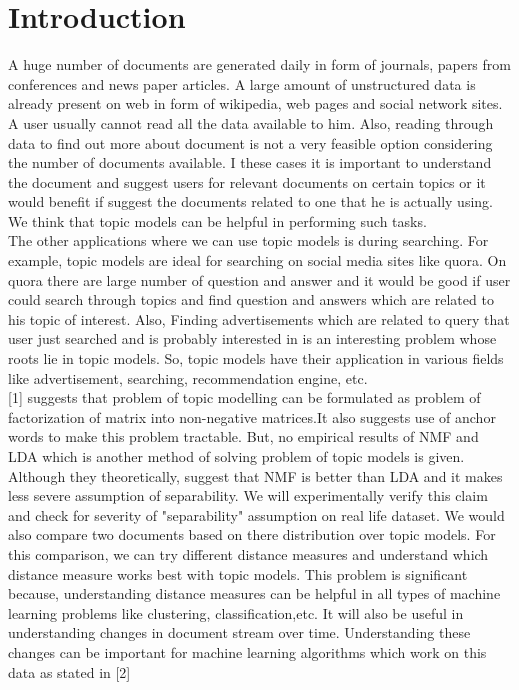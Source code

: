\documentclass[a4paper,11pt]{article}
\begin{document}
\pagebreak

\section{Introduction}
A huge number of documents are generated daily in form of journals, papers from conferences and  news paper articles. A large amount of unstructured data is already present on web in form of wikipedia, web pages and social network sites. A user usually cannot read all the data available to him. Also, reading through data to find out more about document is not a very feasible option considering the number of documents available. I these cases it is important to understand the document and suggest users for relevant documents on certain topics or it would benefit if suggest the documents related to one that he is actually using. We think that topic models can be helpful in performing such tasks. \\

The other applications where we can use topic models is during searching. For example, topic models are ideal for searching on social media sites like quora. On quora there are large number of question and answer and it would be good if user could search through topics and find question and answers which are related to his topic of interest. Also, Finding advertisements which are related to query that user just searched and is probably interested in is an interesting problem whose roots lie in topic models. So, topic models have their application in various fields like advertisement, searching, recommendation engine, etc. \\

[1] suggests that problem of topic modelling can be formulated as problem of factorization of matrix into non-negative matrices.It also suggests use of anchor words to make this problem tractable. But, no empirical results of NMF and LDA which is another method of solving problem of topic models is given. Although they theoretically, suggest that NMF is better than LDA and it makes less severe assumption of separability. We will experimentally verify this claim and check for severity of "separability" assumption on real life dataset. We would also compare two documents based on there distribution over topic models. For this comparison, we can try different distance measures and understand which distance measure works best with topic models. This problem is significant because, understanding distance measures can be helpful in all types of machine learning problems like clustering, classification,etc. It will also be useful in understanding changes in document stream over time. Understanding these changes can be important for machine learning algorithms which work on this data as stated in [2]
\end{document}
